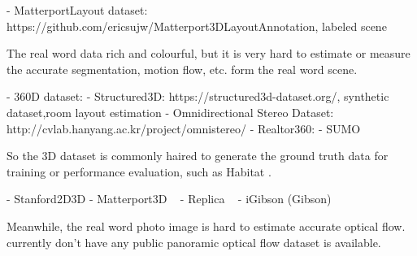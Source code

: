 
- MatterportLayout dataset: https://github.com/ericsujw/Matterport3DLayoutAnnotation, labeled scene

The real word data rich and colourful, but it is very hard to estimate or measure the accurate segmentation, motion flow, etc. form the real word scene.

- 360D dataset:
- Structured3D: https://structured3d-dataset.org/, synthetic dataset,room layout estimation
- Omnidirectional Stereo Dataset: http://cvlab.hanyang.ac.kr/project/omnistereo/
- Realtor360: 
- SUMO

So the 3D dataset is commonly haired to generate the ground truth data for training or performance evaluation, such as Habitat \cite{SavvaKMZWJSLKMPB2019}.

- Stanford2D3D \cite{ArmenSZS2017}
- Matterport3D ~\cite{ChangDFHNSSZZ2017}
- Replica ~\cite{StrauWMCWGEMRVCYBYPYZLCBGMPSBSNGLN2019}
- iGibson (Gibson)


Meanwhile, the real word photo image is hard to estimate accurate optical flow.
 currently don't have any public panoramic optical flow dataset is available.
